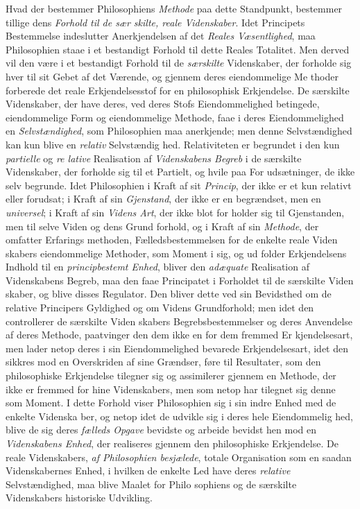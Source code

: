 Hvad der bestemmer Philosophiens \emph{Methode} paa dette
Standpunkt, bestemmer tillige dens \emph{Forhold til de sær\-%
skilte, reale Videnskaber}. Idet Principets Bestemmelse
indeslutter Anerkjendelsen af det \emph{Reales Væsentlighed},
maa Philosophien staae i et bestandigt Forhold til dette Reales
Totalitet. Men derved vil den være i et bestandigt Forhold
til de \emph{særskilte} Videnskaber, der forholde sig hver til sit
Gebet af det Værende, og gjennem deres eiendommelige Me\-%
thoder forberede det reale Erkjendelsesstof for en philosophisk
Erkjendelse. De særskilte Videnskaber, der have deres, ved
deres Stofs Eiendommelighed betingede, eiendommelige Form
og eiendommelige Methode, faae i deres Eiendommelighed en
\emph{Selvstændighed}, som Philosophien maa anerkjende; men
denne Selvstændighed kan kun blive en \emph{relativ} Selvstændig\-%
hed. Relativiteten er begrundet i den kun \emph{partielle} og \emph{re\-%
lative} Realisation af \emph{Videnskabens Begreb} i de særskilte
Videnskaber, der forholde sig til et Partielt, og hvile paa For\-%
udsætninger, de ikke selv begrunde. Idet Philosophien i Kraft
af sit \emph{Princip}, der ikke er et kun relativt eller forudsat; i
Kraft af sin \emph{Gjenstand}, der ikke er en begrændset, men en
\emph{universel}; i Kraft af sin \emph{Videns Art}, der ikke blot for\-%
holder sig til Gjenstanden, men til selve Viden og dens Grund\-%
forhold, og i Kraft af sin \emph{Methode}, der omfatter Erfarings\-%
methoden, Fælledsbestemmelsen for de enkelte reale Viden\-%
skabers eiendommelige Methoder, som Moment i sig, og ud\-%
folder Erkjendelsens Indhold til en \emph{principbestemt Enhed},
 bliver den \emph{adæquate} Realisation af Videnskabens Begreb,
maa den faae Principatet i Forholdet til de særskilte Viden\-%
skaber, og blive disses Regulator. Den bliver dette ved sin
Bevidsthed om de relative Principers Gyldighed og om Videns
Grundforhold; men idet den controllerer de særskilte Viden\-%
skabers Begrebsbestemmelser og deres Anvendelse af deres
Methode, paatvinger den dem ikke en for dem fremmed Er\-%
kjendelsesart, men lader netop deres i sin Eiendommelighed
bevarede Erkjendelsesart, idet den sikkres mod en Overskriden
af sine Grændser, føre til Resultater, som den philosophiske
Erkjendelse tilegner sig og assimilerer gjennem en Methode,
der ikke er fremmed for hine Videnskabers, men som netop
har tilegnet sig denne som Moment. I dette Forhold viser
Philosophien sig i sin indre Enhed med de enkelte Videnska\-%
ber, og netop idet de udvikle sig i deres hele Eiendommelig\-%
hed, blive de sig deres \emph{fælleds Opgave} bevidste og arbeide
bevidst hen mod en \emph{Videnskabens Enhed}, der realiseres
gjennem den philosophiske Erkjendelse. De reale Videnskabers,
\emph{af Philosophien besjælede}, totale Organisation som en
saadan Videnskabernes Enhed, i hvilken de enkelte Led have
deres \emph{relative} Selvstændighed, maa blive Maalet for Philo\-%
sophiens og de særskilte Videnskabers historiske Udvikling.

